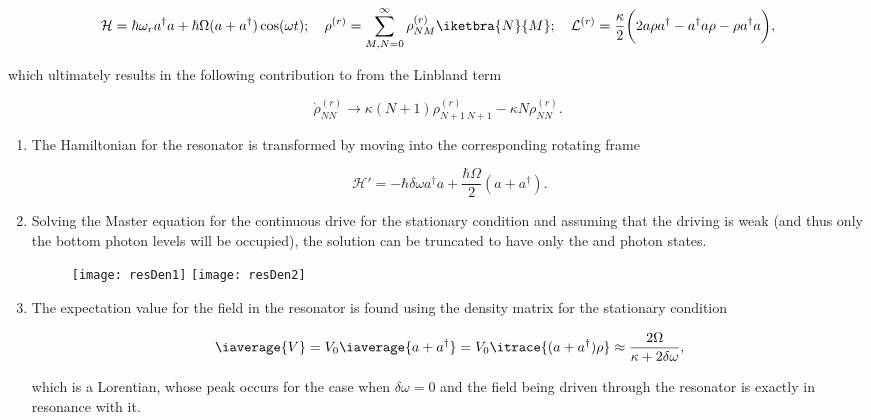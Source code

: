 \begin{equation}\label{ar2}
  \mathcal{H} = \hbar\omega_ra^{\dagger}a+\hbar\Omega(a+a^{\dagger})\cos(\omega t);\quad\rho^{(r)} = \sum_{M,N=0}^{\infty}\rho_{NM}^{(r)}\iketbra{N}{M};\quad \mathcal{L}^{(r)} = \frac{\kappa}{2}\bigg(2a\rho a^{\dagger}-a^{\dagger}a\rho-\rho a^{\dagger}a\bigg),
\end{equation}

\noindent which ultimately results in the following contribution to from
the Linbland term

\begin{equation}\label{ar3}
  \dot{\rho}_{NN}^{(r)} \rightarrow \kappa(N+1)\rho_{N+1\ N+1}^{(r)} - \kappa N \rho_{NN}^{(r)}.
\end{equation}


\begin{enumerate}
\item The  Hamiltonian for the  resonator is transformed by  moving into
  the corresponding rotating frame

  \begin{equation}\label{ar4}
    \mathcal{H'} = -\hbar\delta\omega a^{\dagger}a+\frac{\hbar\Omega}{2}(a+a^{\dagger}).
  \end{equation}

\item  Solving the  Master equation  for  the continuous  drive for  the
  stationary condition and  assuming that the driving is  weak (and thus
  only the bottom  photon levels will be occupied), the  solution can be
  truncated to have only the  and  photon states.

  \begin{figure}[h]
    \texttt{[image: resDen1]}
    \texttt{[image: resDen2]}
  \end{figure}

\item The  expectation value  for the  field in  the resonator  is found
  using the density matrix for the stationary condition

  \begin{equation}\label{filedRes}
    \iaverage{V} = V_0\iaverage{a+a^{\dagger}} = V_0\itrace{(a+a^{\dagger})\rho}\approx\frac{2\Omega}{\kappa+2\delta\omega},
  \end{equation}

  \noindent which  is a Lorentian, whose  peak occurs for the  case when
  $ \delta\omega=0 $ and the field being driven through the resonator is
  exactly in resonance with it.
\end{enumerate}


